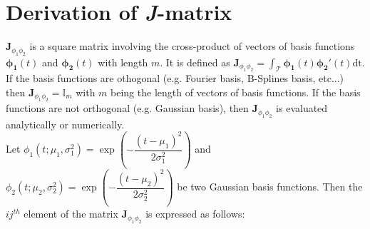\section{Derivation of \textbf{\textit{J}}-matrix}
$\bm{J}_{\phi_1 \phi_2}$ is a square matrix involving the cross-product of vectors of basis functions $\bm{\phi_1}(t)$ and $\bm{\phi_2}(t)$ with length $m$. It is defined as $\bm{J}_{\phi_1 \phi_2} = \int_{\mathcal{T}} \bm{\phi_1}(t)\bm{\phi_2}'(t)\mathrm{dt}$. If the basis functions are othogonal (e.g. Fourier basis, B-Splines basis, etc...) then $\bm{J}_{\phi_1 \phi_2} = \mathbb{I}_{m}$ with $m$ being the length of vectors of basis functions. If the basis functions are not orthogonal (e.g. Gaussian basis), then $\bm{J}_{\phi_1 \phi_2}$ is evaluated analytically or numerically. \\
Let $\phi_1(t;\mu_1 ,\sigma^2_1) = \exp \left(-\dfrac{\left(t-\mu_1\right)^2}{2\sigma^2_1}\right)$ and $\phi_2(t;\mu_2 ,\sigma^2_2) = \exp \left(-\dfrac{\left(t-\mu_2\right)^2}{2\sigma^2_2}\right)$ be two Gaussian basis functions. Then the $ij^{th}$ element of the matrix $\bm{J}_{\phi_1 \phi_2}$ is expressed as follows:

